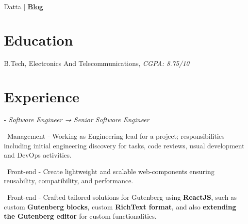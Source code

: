 \documentclass[]{resume}
\begin{document}
     
  
 {Datta} | \href{https://souptik.dev/}{\textbf{Blog}}


%
%
\section{Education}
\raggedright

    \hspace*{\fill}  

    B.Tech, Electronics And Telecommunications, \textit{CGPA: 8.75/10}\hspace*{\fill}

    \sectionsep


       \section{Experience}
       \raggedright
         
            - \textit{Software Engineer → Senior Software Engineer}\hspace*{\fill}  

            \textbullet\ Management - Working as Engineering lead for a project; responsibilities including initial engineering discovery for tasks, code reviews, usual development and DevOps activities.

            \textbullet\ Front-end - Create lightweight and scalable web-components ensuring reusability, compatibility, and performance. 

            \textbullet\ Front-end - Crafted tailored solutions for Gutenberg using \textbf{ReactJS}, such as custom \textbf{Gutenberg blocks}, custom \textbf{RichText format}, and also \textbf{extending the Gutenberg editor} for custom functionalities.
\end{document}
